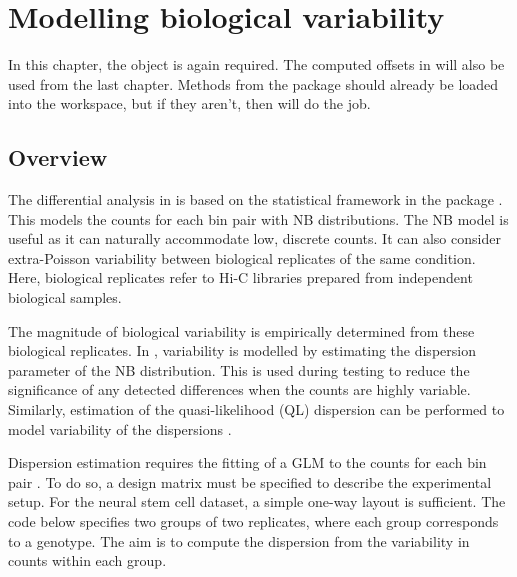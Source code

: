 \documentclass{report}\usepackage[]{graphicx}\usepackage[usenames,dvipsnames]{color}
\newenvironment{combox}
{ \definecolor{shadecolor}{RGB}{255, 240, 240} \begin{shaded}\begin{center}\begin{minipage}[t]{0.95\textwidth} }
{ \end{minipage}\end{center}\end{shaded} \definecolor{shadecolor}{RGB}{240,240,240} }
\begin{document}
\chapter{Modelling biological variability}

\begin{combox}
In this chapter, the  object is again required.
The computed offsets in  will also be used from the last chapter.
Methods from the  package should already be loaded into the workspace, but if they aren't, then  will do the job.
\end{combox}

\section{Overview}
The differential analysis in  is based on the statistical framework in the  package \cite{edgeR}.
This models the counts for each bin pair with NB distributions.
The NB model is useful as it can naturally accommodate low, discrete counts.
It can also consider extra-Poisson variability between biological replicates of the same condition.
Here, biological replicates refer to Hi-C libraries prepared from independent biological samples.

The magnitude of biological variability is empirically determined from these biological replicates.
In , variability is modelled by estimating the dispersion parameter of the NB distribution.
This is used during testing to reduce the significance of any detected differences when the counts are highly variable.
Similarly, estimation of the quasi-likelihood (QL) dispersion can be performed to model variability of the dispersions \cite{lund2012ql}. 

Dispersion estimation requires the fitting of a GLM to the counts for each bin pair \cite{mccarthy2012glm}. 
To do so, a design matrix must be specified to describe the experimental setup.
For the neural stem cell dataset, a simple one-way layout is sufficient.
The code below specifies two groups of two replicates, where each group corresponds to a genotype.
The aim is to compute the dispersion from the variability in counts within each group.
\end{document}
